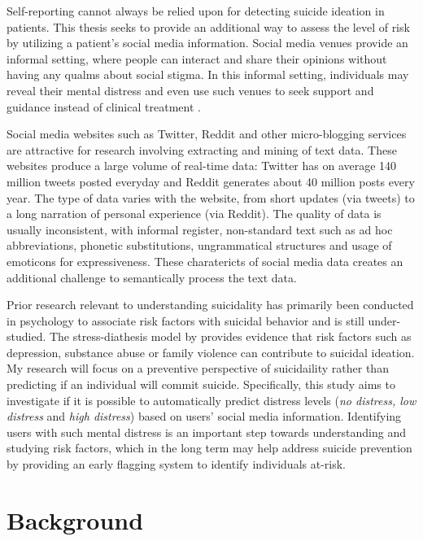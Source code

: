 Self-reporting cannot always be relied upon for detecting suicide ideation in patients. This thesis seeks to provide an additional way to assess the level of risk by utilizing a patient's social media information. Social media venues provide an informal setting, where people can interact and share their opinions without having any qualms about social stigma. In this informal setting, individuals may reveal their mental distress and even use such venues to seek support and guidance instead of clinical treatment \citep{bruffaerts2011treatment,ryan2010universal,crosby2011self}. 

Social media websites such as Twitter, Reddit and other micro-blogging services are attractive for research involving extracting and mining of text data. These websites produce a large volume of real-time data: Twitter has on average 140 million tweets posted everyday and Reddit generates about 40 million posts every year. The type of data varies with the website, from short updates (via tweets) to a long narration of personal experience (via Reddit). The quality of data is usually inconsistent, with informal register, non-standard text such as ad hoc abbreviations, phonetic substitutions, ungrammatical structures and usage of emoticons for expressiveness. These charatericts of social media data creates an additional challenge to semantically process the text data.

Prior research relevant to understanding suicidality has primarily been conducted in psychology to associate risk factors with suicidal behavior and is still under-studied. The stress-diathesis model by \cite{mann1999toward} provides evidence that risk factors such as depression, substance abuse or family violence can contribute to suicidal ideation. My research will focus on a preventive perspective of suicidaility rather than predicting if an individual will commit suicide. Specifically, this study aims to investigate if it is possible to automatically predict distress levels  (\textit{no distress, low distress} and\textit{ high distress}) based on users' social media information. Identifying users with such mental distress is an important step towards understanding and studying risk factors, which in the long term may help address suicide prevention by providing an early flagging system to identify individuals at-risk.



\section{Background}

